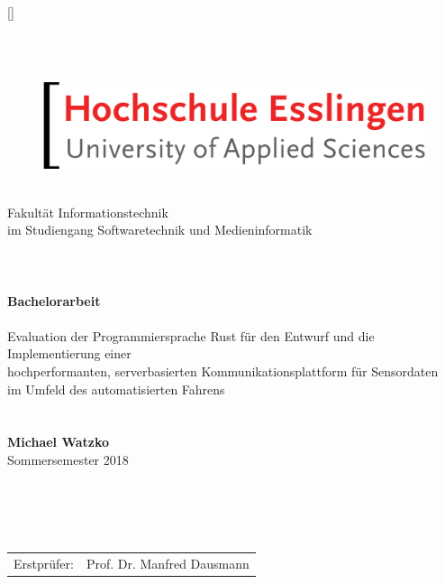 

\newcommand{\setitle}{Bachelorarbeit}
\newcommand{\seauthor}{Michael Watzko}
\newcommand{\figurewidth}{0.66\textwidth}

\clearscrheadings
\clearscrplain

\pagestyle{scrheadings}	

\ihead[]{\leftmark}
\ohead[]{\rightmark}

\ifoot[]{}
\ofoot[\pagemark]{\pagemark}
\setheadsepline{.4pt}[\color{black}]

\begin{titlepage}
	\centering
	~\\ ~\\ 
	\begin{figure}[H]
		\centering
		\includegraphics[width=.5\textwidth]{images/hs_logo.png}
	\end{figure}
	~\\
	Fakultät Informationstechnik \\
	im Studiengang Softwaretechnik und Medieninformatik
	 ~\\ ~\\ ~\\ ~\\
	\LARGE{
		\textbf{\setitle} ~\\ ~\\
		Evaluation der Programmiersprache Rust für den
		Entwurf und die Implementierung einer\\hochperformanten,
		serverbasierten Kommunikationsplattform für Sensordaten\\
		im Umfeld des automatisierten Fahrens
	}
	~\\ ~\\ ~\\
	\normalsize \textbf{Michael Watzko} \\
	Sommersemester 2018
	 ~\\ ~\\ ~\\ ~\\ ~\\
	\begin{tabular}{rl}
		Erstprüfer: & Prof. Dr. Manfred Dausmann\\

\end{tabular}
\end{titlepage}
